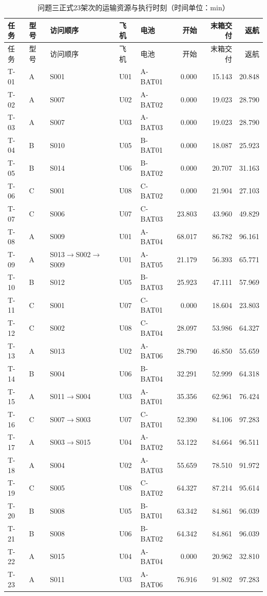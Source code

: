 \documentclass[withoutpreface,colorprint]{format}
\numberwithin{equation}{section}
\numberwithin{figure}{section}
\numberwithin{table}{section}
\begin{document}
\begingroup\small\setlength{\tabcolsep}{3pt}
\begin{longtable}{llp{2.9cm}llrrr}
\caption{问题三正式23架次的运输资源与执行时刻（时间单位：min）}\label{tab:q3_full_schedule}\\
\toprule 任务 & 型号 & 访问顺序 & 飞机 & 电池 & 开始 & 末箱交付 & 返航\\\midrule
\endfirsthead
\toprule 任务 & 型号 & 访问顺序 & 飞机 & 电池 & 开始 & 末箱交付 & 返航\\\midrule
\endhead
T-01 & A & S001 & U01 & A-BAT01 & 0.000 & 15.143 & 20.848\\
T-02 & A & S007 & U02 & A-BAT02 & 0.000 & 19.023 & 28.790\\
T-03 & A & S007 & U03 & A-BAT03 & 0.000 & 19.023 & 28.790\\
T-04 & B & S010 & U05 & B-BAT01 & 0.000 & 18.087 & 25.923\\
T-05 & B & S014 & U06 & B-BAT02 & 0.000 & 20.707 & 31.163\\
T-06 & C & S001 & U08 & C-BAT02 & 0.000 & 21.904 & 27.103\\
T-07 & C & S006 & U07 & C-BAT03 & 23.803 & 43.960 & 49.829\\
T-08 & A & S009 & U01 & A-BAT04 & 68.017 & 86.782 & 96.161\\
T-09 & A & S013$\to$S002$\to$S009 & U01 & A-BAT05 & 21.179 & 56.393 & 65.771\\
T-10 & B & S012 & U05 & B-BAT03 & 25.923 & 47.111 & 57.969\\
T-11 & C & S001 & U07 & C-BAT01 & 0.000 & 18.604 & 23.803\\
T-12 & C & S002 & U08 & C-BAT04 & 28.097 & 53.986 & 64.327\\
T-13 & A & S013 & U02 & A-BAT06 & 28.790 & 46.850 & 55.659\\
T-14 & B & S004 & U06 & B-BAT04 & 32.291 & 52.999 & 64.318\\
T-15 & A & S011$\to$S004 & U03 & A-BAT01 & 35.356 & 62.961 & 76.424\\
T-16 & C & S007$\to$S003 & U07 & C-BAT01 & 52.390 & 84.106 & 97.283\\
T-17 & A & S003$\to$S015 & U04 & A-BAT02 & 53.122 & 84.664 & 96.511\\
T-18 & A & S004 & U02 & A-BAT03 & 55.659 & 78.510 & 91.972\\
T-19 & C & S005 & U08 & C-BAT02 & 64.327 & 87.214 & 95.614\\
T-20 & B & S008 & U05 & B-BAT01 & 63.342 & 84.861 & 96.039\\
T-21 & B & S008 & U06 & B-BAT02 & 64.342 & 84.861 & 96.039\\
T-22 & A & S015 & U04 & A-BAT04 & 0.000 & 20.962 & 32.810\\
T-23 & A & S011 & U03 & A-BAT06 & 76.916 & 91.802 & 97.283\\
\bottomrule\end{longtable}
\endgroup
\end{document}
